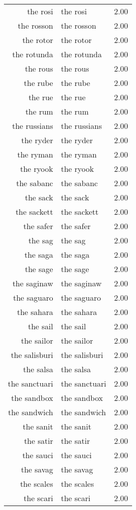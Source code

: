 \begin{table}[ht]
\begin{tabular}{rlr}
  the rosi & the rosi & 2.00 \\ 
  the rosson & the rosson & 2.00 \\ 
  the rotor & the rotor & 2.00 \\ 
  the rotunda & the rotunda & 2.00 \\ 
  the rous & the rous & 2.00 \\ 
  the rube & the rube & 2.00 \\ 
  the rue & the rue & 2.00 \\ 
  the rum & the rum & 2.00 \\ 
  the russians & the russians & 2.00 \\ 
  the ryder & the ryder & 2.00 \\ 
  the ryman & the ryman & 2.00 \\ 
  the ryook & the ryook & 2.00 \\ 
  the sabanc & the sabanc & 2.00 \\ 
  the sack & the sack & 2.00 \\ 
  the sackett & the sackett & 2.00 \\ 
  the safer & the safer & 2.00 \\ 
  the sag & the sag & 2.00 \\ 
  the saga & the saga & 2.00 \\ 
  the sage & the sage & 2.00 \\ 
  the saginaw & the saginaw & 2.00 \\ 
  the saguaro & the saguaro & 2.00 \\ 
  the sahara & the sahara & 2.00 \\ 
  the sail & the sail & 2.00 \\ 
  the sailor & the sailor & 2.00 \\ 
  the salisburi & the salisburi & 2.00 \\ 
  the salsa & the salsa & 2.00 \\ 
  the sanctuari & the sanctuari & 2.00 \\ 
  the sandbox & the sandbox & 2.00 \\ 
  the sandwich & the sandwich & 2.00 \\ 
  the sanit & the sanit & 2.00 \\ 
  the satir & the satir & 2.00 \\ 
  the sauci & the sauci & 2.00 \\ 
  the savag & the savag & 2.00 \\ 
  the scales & the scales & 2.00 \\ 
  the scari & the scari & 2.00 \\ 

\end{tabular}
\end{table}
